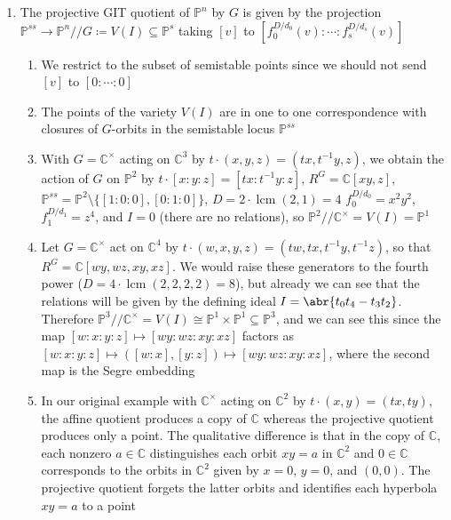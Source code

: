 \documentclass[11pt,leqno]{article}
\theoremstyle{plain}
\theoremstyle{definition}
\numberwithin{equation}{section}
\numberwithin{lem}{section}
\DeclareMathOperator{\lcm}{lcm}
\begin{document}
\begin{enumerate}
\begin{enumerate}
\begin{enumerate}
            \item Let $I$ be the kernel of the map of graded rings $\mathbb C[t_0,\dots,t_s]\to \bigoplus_{\ell\geq 0}R^G_{\ell\cdot D}$ sending $t_i$ to $f_i^{D/d_i}$ (contrast with the affine GIT quotient!). The homogeneous ideal $I$ records the relations between the homogeneous generators $f_i^{D/d_i}$ of $R^G_{D}$, and this explains why it does not matter if we take $D$ to be a larger multiple of the $d_i$
        \end{enumerate}
        \item The projective GIT quotient of $\mathbb P^n$ by $G$ is given by the projection $\mathbb P^{ss}\to \mathbb P^n/\!/G\coloneqq V(I)\subseteq \mathbb P^s$ taking $[v]$ to $[f_0^{D/d_0}(v):\cdots:f_s^{D/d_s}(v)]$
        \begin{enumerate}
            \item We restrict to the subset of semistable points since we should not send $[v]$ to $[0\colon\cdots\colon 0]$
            \item The points of the variety $V(I)$ are in one to one correspondence with closures of $G$-orbits in the semistable locus $\mathbb P^{ss}$
            \item With $G = \mathbb C^\times$ acting on $\mathbb C^3$ by $t\cdot(x,y,z) = (tx,t^{-1}y,z)$, we obtain the action of $G$ on $\mathbb P^2$ by $t\cdot[x:y:z] = [tx:t^{-1}y:z]$, $R^G = \mathbb C[xy,z]$, $\mathbb P^{ss} = \mathbb P^2\setminus\{[1:0:0], [0:1:0]\}$, $D= 2\cdot \lcm(2,1) = 4$ $f_0^{D/d_0} = x^2y^2$, $f_1^{D/d_1} = z^4$, and $I = 0$ (there are no relations), so $\mathbb P^2/\!/\mathbb C^\times = V(I) = \mathbb P^1$
            \item Let $G= \mathbb C^\times$ act on $\mathbb C^4$ by $t\cdot(w,x,y,z) = (tw,tx,t^{-1}y,t^{-1}z)$, so that $R^G = \mathbb C[wy,wz,xy,xz]$. We would raise these generators to the fourth power ($D = 4\cdot \lcm(2,2,2,2) = 8$), but already we can see that the relations will be given by the defining ideal $I = \abr{t_0t_4-t_3t_2}$. Therefore $\mathbb P^3/\!/\mathbb C^\times = V(I) \cong \mathbb P^1\times \mathbb P^1\subseteq \mathbb P^3$, and we can see this since the map $[w:x:y:z]\mapsto [wy:wz:xy:xz]$ factors as $[w:x:y:z]\mapsto ([w:x],[y:z])\mapsto[wy:wz:xy:xz]$, where the second map is the Segre embedding
            \item In our original example with $\mathbb C^\times$ acting on $\mathbb C^2$ by $t\cdot (x,y) = (tx,ty)$, the affine quotient produces a copy of $\mathbb C$ whereas the projective quotient produces only a point. The qualitative difference is that in the copy of $\mathbb C$, each nonzero $a\in\mathbb C$ distinguishes each orbit $xy=a$ in $\mathbb C^2$ and $0\in\mathbb C$ corresponds to the orbits in $\mathbb C^2$ given by $x=0$, $y=0$, and $(0,0)$. The projective quotient forgets the latter orbits and identifies each hyperbola $xy=a$ to a point

\end{enumerate}
\end{enumerate}
\end{enumerate}
\end{document}
